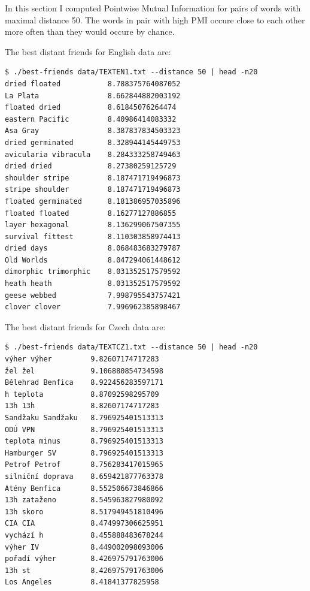 \documentclass[12pt,a4paper]{article}
\begin{document}
In this section I computed Pointwise Mutual Information for pairs of words with
maximal distance 50. The words in pair with high PMI occure close to each other
more often than they would occure by chance. 

The best distant friends for English data are:
\begin{verbatim}
$ ./best-friends data/TEXTEN1.txt --distance 50 | head -n20
dried floated       	8.788375764087052
La Plata            	8.662844882003192
floated dried       	8.61845076264474
eastern Pacific     	8.40986414083332
Asa Gray            	8.387837834503323
dried germinated    	8.328944145449753
avicularia vibracula	8.284333258749463
dried dried         	8.27380259125729
shoulder stripe     	8.187471719496873
stripe shoulder     	8.187471719496873
floated germinated  	8.181386957035896
floated floated     	8.16277127886855
layer hexagonal     	8.136299067507355
survival fittest    	8.110303858974413
dried days          	8.068483683279787
Old Worlds          	8.047294061448612
dimorphic trimorphic	8.031352517579592
heath heath         	8.031352517579592
geese webbed        	7.998795543757421
clover clover       	7.996962385898467
\end{verbatim}

\noindent
The best distant friends for Czech data are:
\begin{verbatim}
$ ./best-friends data/TEXTCZ1.txt --distance 50 | head -n20
výher výher       	9.82607174717283
žel žel           	9.106880854734598
Bělehrad Benfica  	8.922456283597171
h teplota         	8.87092598295709
13h 13h           	8.82607174717283
Sandžaku Sandžaku 	8.796925401513313
ODÚ VPN           	8.796925401513313
teplota minus     	8.796925401513313
Hamburger SV      	8.796925401513313
Petrof Petrof     	8.756283417015965
silniční doprava  	8.659421877763378
Atény Benfica     	8.552506673846866
13h zataženo      	8.545963827980092
13h skoro         	8.517949451810496
CIA CIA           	8.474997306625951
vychází h         	8.455888483678244
výher IV          	8.449002098093006
pořadí výher      	8.426975791763006
13h st            	8.426975791763006
Los Angeles       	8.41841377825958
\end{verbatim}
\end{document}
